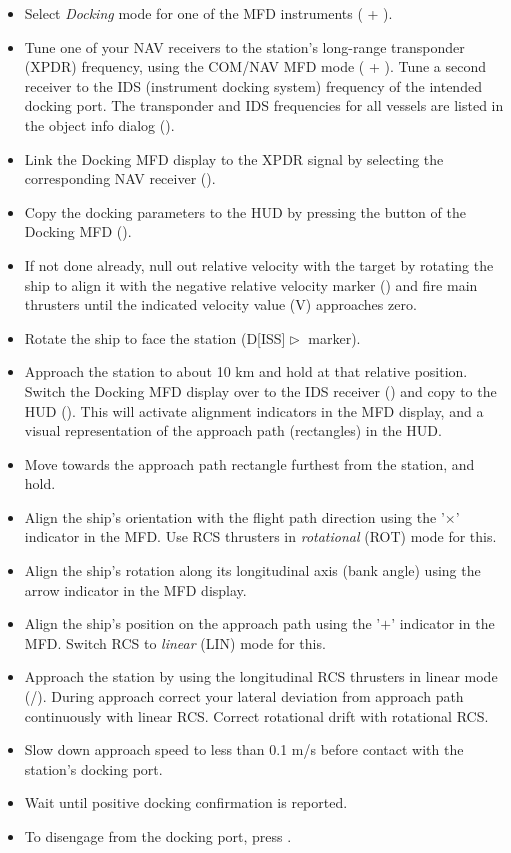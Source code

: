 \documentclass[Orbiter User Manual.tex]{subfiles}
\begin{document}
\begin{itemize}
	\item Select \emph{Docking} mode for one of the MFD instruments (
		+ ).
	\item Tune one of your NAV receivers to the station's long-range transponder
		(XPDR) frequency, using the COM/NAV MFD mode ( + ).
		Tune a second receiver to the IDS (instrument docking system) frequency
		of the intended docking port. The transponder and IDS frequencies for
		all vessels are listed in the object info dialog ().
	\item Link the Docking MFD display to the XPDR signal by selecting the
		corresponding NAV receiver ().
	\item Copy the docking parameters to the HUD by pressing the 
		button of the Docking MFD ().
	\item If not done already, null out relative velocity with the target by
		rotating the ship to align it with the negative relative velocity marker
		(\retrograde) and fire main thrusters until the indicated velocity value
		(V) approaches zero.
	\item Rotate the ship to face the station (D[ISS]$\vartriangleright$
		marker).
	\item Approach the station to about 10 km and hold at that relative
		position. Switch the Docking MFD display over to the IDS receiver
		() and copy to the HUD (). This will activate
		alignment indicators in the MFD display, and a visual representation of
		the approach path (rectangles) in the HUD.
	\item Move towards the approach path rectangle furthest from the station,
		and hold.
	\item Align the ship's orientation with the flight path direction using the
		'$\times$' indicator in the MFD. Use RCS thrusters in \emph{rotational}
		(ROT) mode for this.
	\item Align the ship's rotation along its longitudinal axis (bank angle)
		using the arrow indicator in the MFD display.
	\item Align the ship's position on the approach path using the '$+$'
		indicator in the MFD. Switch RCS to \emph{linear} (LIN) mode for this.
	\item Approach the station by using the longitudinal RCS thrusters in linear
		mode (/\num{}). During approach correct your
		lateral deviation from approach path continuously with linear RCS.
		Correct rotational drift with rotational RCS.
	\item Slow down approach speed to less than 0.1 m/s before contact with the
		station's docking port.
	\item Wait until positive docking confirmation is reported.
	\item To disengage from the docking port, press .
\end{itemize}
\end{document}
